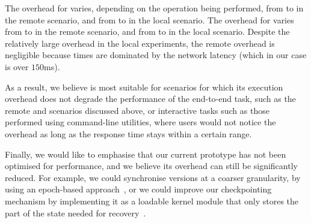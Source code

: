 The overhead for \redis varies, depending on the operation being
performed, from \minRedisRemote to \maxRedisRemote in the remote
scenario, and from \minRedisOver to \maxRedisOver in the local
scenario.  The overhead for \lighttpd varies from \minLighttpdRemote
to \maxLighttpdRemote in the remote scenario, and
from \minLighttpdOver to \maxLighttpdOver in the local scenario.
Despite the relatively large overhead in the local experiments, the
remote overhead is negligible because times are dominated by the
network latency (which in our case is over $150$ms).

As a result, we believe \mx is most suitable for scenarios for which
its execution overhead does not degrade the performance of the
end-to-end task, such as the remote \redis and \lighttpd scenarios
discussed above, or interactive tasks such as those performed using
command-line utilities, where users would not notice the overhead as
long as the response time stays within a certain range.


Finally, we would like to emphasise that our current prototype has not
been optimised for performance, and we believe its overhead can still
be significantly reduced.  
For example, we could synchronise versions at a coarser granularity,
by using an epoch-based approach~\cite{compl-schedules11}, or we could
improve our checkpointing mechanism by implementing it as a loadable
kernel module that only stores the part of the state needed for
recovery~\cite{flashback}.



